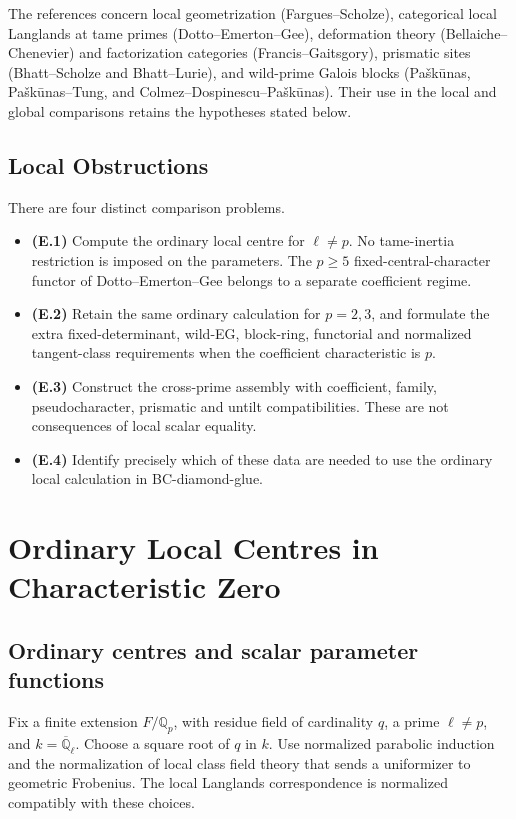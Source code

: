 The references concern local geometrization (Fargues--Scholze),
categorical local Langlands at tame primes (Dotto--Emerton--Gee),
deformation theory (Bellaiche--Chenevier) and factorization categories
(Francis--Gaitsgory),
prismatic sites (Bhatt--Scholze and Bhatt--Lurie), and wild-prime
Galois blocks (Pa{\v s}k{\=u}nas, Pa{\v s}k{\=u}nas--Tung, and
Colmez--Dospinescu--Pa{\v s}k{\=u}nas). Their use in the local and
global comparisons retains the hypotheses stated below.

\subsection{Local Obstructions}

There are four distinct comparison problems.
\begin{itemize}
\item \textbf{(E.1)} Compute the ordinary local centre for
$\ell\neq p$. No tame-inertia restriction is imposed on the parameters.
The $p\geq5$ fixed-central-character functor of Dotto--Emerton--Gee
belongs to a separate coefficient regime.
\item \textbf{(E.2)} Retain the same ordinary calculation for
$p=2,3$, and formulate the extra fixed-determinant, wild-EG,
block-ring, functorial and normalized tangent-class requirements
when the coefficient characteristic is $p$.
\item \textbf{(E.3)} Construct the cross-prime assembly with
coefficient, family, pseudocharacter, prismatic and untilt
compatibilities. These are not consequences of local scalar equality.
\item \textbf{(E.4)} Identify precisely which of these data are
needed to use the ordinary local calculation in BC-diamond-glue.
\end{itemize}

\section{Ordinary Local Centres in Characteristic Zero}
\label{v4-arith:w10-e:tame-odd}

\subsection{Ordinary centres and scalar parameter functions}

Fix a finite extension \(F/\mathbb Q_p\), with residue field of
cardinality \(q\), a prime \(\ell\neq p\), and
\(k=\overline{\mathbb Q}_{\ell}\). Choose a square root of \(q\)
in \(k\). Use normalized parabolic induction and the normalization
of local class field theory that sends a uniformizer to geometric
Frobenius. The local Langlands correspondence is normalized
compatibly with these choices.

